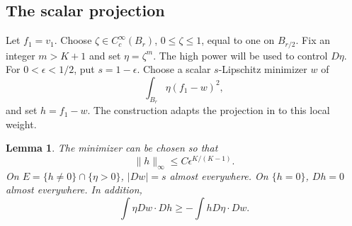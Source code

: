 \documentclass[11pt]{article}
\newtheorem{lemma}{Lemma}[section]
\theoremstyle{remark}
\numberwithin{equation}{section}
\begin{document}
\subsection{The scalar projection}

Let \(f_1=v_1\). Choose \(\zeta\in C_c^\infty(B_r)\), \(0\le\zeta\le1\),
equal to one on \(B_{r/2}\). Fix an integer \(m>K+1\) and set
\(\eta=\zeta^m\). The high power will be used to control \(D\eta\).
For \(0<\epsilon<1/2\), put \(s=1-\epsilon\).
Choose a scalar \(s\)-Lipschitz minimizer \(w\) of
\[
\int_{B_r}\eta(f_1-w)^2,
\]
and set \(h=f_1-w\). The construction adapts the projection in
\cite[Lemma~4]{Agazzi} to this local weight.

\begin{lemma}\label{lem:projection}
The minimizer can be chosen so that
\begin{equation}\label{eq:residual}
\|h\|_\infty\le C\epsilon^{K/(K-1)}.
\end{equation}
On \(E=\{h\ne0\}\cap\{\eta>0\}\), \(|Dw|=s\) almost everywhere.
On \(\{h=0\}\), \(Dh=0\) almost everywhere. In addition,
\begin{equation}\label{eq:translation}
\int\eta Dw\cdot Dh\ge-\int hD\eta\cdot Dw.
\end{equation}
\end{lemma}
\end{document}
